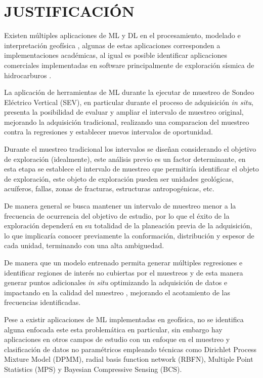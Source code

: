 \chapter{JUSTIFICACIÓN}
Existen múltiples aplicaciones de ML y DL en el procesamiento, modelado e interpretación geofísica \citep{li2024, liu2020,el2001,wrona2018}, algunas de estas aplicaciones corresponden a implementaciones académicas, al igual es posible identificar aplicaciones comerciales implementadas en software principalmente de exploración sísmica de hidrocarburos \citep{diaferia2024high, panebianco2024automated}.



La aplicación de herramientas de ML durante la ejecutar de muestreo de Sondeo Eléctrico Vertical (SEV), en particular durante el proceso de adquisición \textit{in situ}, presenta la posibilidad de evaluar y ampliar el intervalo de muestreo original, mejorando la adquisición tradicional, realizando una comparacion del muestreo contra la regresiones y establecer nuevos intervalos de oportunidad.

Durante el muestreo tradicional los intervalos se diseñan considerando el objetivo de exploración (idealmente), este análisis previo es un factor determinante, en esta etapa se establece el intervalo de muestreo que permitiría identificar el objeto de exploración, este objeto de exploración pueden ser unidades geológicas, acuíferos, fallas, zonas de fracturas, estructuras antropogénicas, etc.

De manera general se busca mantener un intervalo de muestreo menor a la frecuencia de ocurrencia del objetivo de estudio, por lo que el éxito de la exploración dependerá en su totalidad de la planeación previa de la adquisición, lo que implicaría conocer previamente la conformación, distribución y espesor de cada unidad, terminando con una alta ambiguedad.

De manera que un modelo entrenado permita generar múltiples regresiones e identificar regiones de interés no cubiertas por el muestreos y de esta manera generar puntos adicionales \textit{in situ} optimizando la adquisición de datos e impactando en la calidad del muestreo , mejorando el acotamiento de las frecuencias identificadas.

Pese a existir aplicaciones de ML implementadas en geofísica, no se identifica alguna enfocada este esta problemática en particular, sin embargo hay aplicaciones en otros campos de estudio con un enfoque en el muestreo y clasificación de datos no paramétricos \citep{entezami2022non, bkassiny2013multidimensional, shi2021non} empleando técnicas como Dirichlet Process Mixture Model (DPMM), radial basis function network (RBFN),  Multiple Point Statistics (MPS) y Bayesian Compressive Sensing (BCS).

